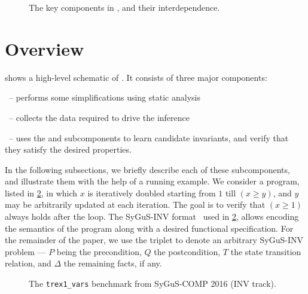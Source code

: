 \documentclass[conference]{IEEEtran}
\begin{document}
\begin{figure}[!t]
\centering
\caption{The key components in \LoopInvGen, and their interdependence.}
\label{fig:overview}
\end{figure}





\section{Overview} \label{subsec:Overview}

\noindent
{} shows a high-level schematic of \LoopInvGen.
It consists of three major components:
\begin{andlist}
    \item \Process\ -- performs some simplifications using static analysis
    \item \Record\ -- collects the data required to drive the inference
    \item \Infer\ -- uses the \PIE and \Checker subcomponents to learn candidate invariants,
          and verify that they satisfy the desired properties.
\end{andlist}

In the following subsections, we briefly describe each of these subcomponents,
and illustrate them with the help of a running example.
We consider a program, listed in \cref{code:sygus},
in which $x$ is iteratively doubled starting from $1$ till $(x \geqslant y)$,
and $y$ may be arbitrarily updated at each iteration.
The goal is to verify that $(x \geqslant 1)$ always holds after the loop.
The SyGuS-INV format~\cite{Alur2016SyGuSComp2R} used in \cref{code:sygus},
allows encoding the semantics of the program along with a desired functional specification.
For the remainder of the paper, we use the triplet \SyGuSINVQuadruplet to denote an arbitrary SyGuS-INV problem ---
$P$ being the precondition, $Q$ the postcondition, $T$ the state transition relation, and $\Delta$ the remaining facts, if any.

\begin{figure}[!t]
    \begin{tcolorbox}
          [boxrule=0.5pt,arc=2pt,boxsep=0pt,
           left=2pt,right=-10pt,top=-2pt,bottom=-3pt,
           colback=white,colframe=darkbordercolor]
        
    \end{tcolorbox}
    \caption{The \texttt{trex1\_vars} benchmark from SyGuS-COMP 2016 (INV track).}
    \label{code:sygus}
\end{figure}
\end{document}
